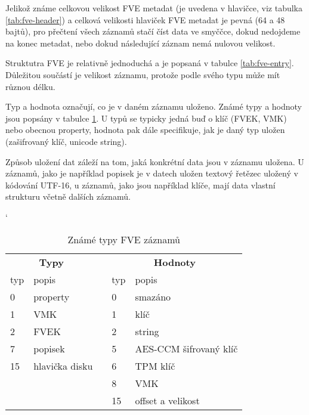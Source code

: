 Jelikož známe celkovou velikost FVE metadat (je uvedena v hlavičce, viz tabulka \ref{tab:fve-header}) a celková velikosti hlaviček FVE metadat je pevná (64 a 48 bajtů), pro přečtení všech záznamů stačí číst data ve smyččce, dokud nedojdeme na konec metadat, nebo dokud následující záznam nemá nulovou velikost.

Struktutra FVE je relativně jednoduchá a je popsaná v tabulce \ref{tab:fve-entry}. Důležitou součástí je velikost záznamu, protože podle svého typu může mít různou délku.


Typ a hodnota označují, co je v daném záznamu uloženo. Známé typy a hodnoty jsou popsány v tabulce \ref{tab:fve-entry-types}. U typů se typicky jedná buď o klíč (FVEK, VMK) nebo obecnou property, hodnota pak dále specifikuje, jak je daný typ uložen (zašifrovaný klíč, unicode string).

Způsob uložení dat záleží na tom, jaká konkrétní data jsou v záznamu uložena. U  záznamů, jako je například popisek je v datech uložen textový řetězec uložený v kódování UTF-16, u  záznamů, jako jsou například klíče, mají data vlastní strukturu včetně dalších záznamů.

\begin{table}[h]
\catcode`
\captionsetup{width=0.65\linewidth}
\caption{Známé typy FVE záznamů}
\label{tab:fve-entry-types}
\begin{center}
\centering
\begin{tabular}{|l|l|c|l|l|}
  \cline{1-2} \cline{4-5}
   \multicolumn{2}{|c|}{\textbf{Typy}} &  & \multicolumn{2}{|c|}{\textbf{Hodnoty}} \\ \cline{1-2} \cline{4-5}
   typ & popis &  & typ & popis \\ \cline{1-2} \cline{4-5}
   0 & property & & 0 & smazáno \\ \cline{1-2} \cline{4-5}
   1 & VMK & & 1 & klíč \\ \cline{1-2} \cline{4-5}
   2 & FVEK & & 2 & string \\ \cline{1-2} \cline{4-5}
   7 & popisek & & 5 & AES-CCM šifrovaný klíč \\ \cline{1-2} \cline{4-5}
   15 & hlavička disku\footnotemark & & 6 & TPM klíč \\ \cline{1-2} \cline{4-5}
   \multicolumn{2}{c}{} & & 8 & VMK \\ \cline{4-5}
   \multicolumn{2}{c}{} & & 15 & offset a velikost \\ \cline{4-5}
   

\end{tabular}
\end{center}
\end{table}

